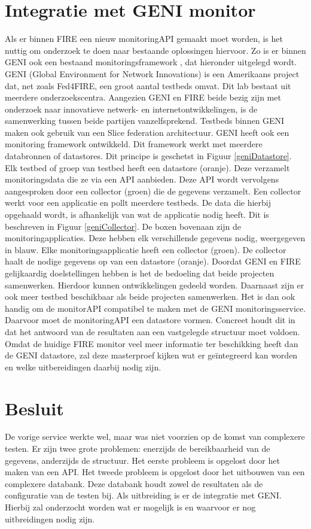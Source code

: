 \section{Integratie met GENI monitor}
\npar
Als er binnen FIRE een nieuw monitoringAPI gemaakt moet worden, is het nuttig om onderzoek te doen naar bestaande oplossingen hiervoor. Zo is er binnen GENI ook een bestaand monitoringsframework \citep{geni-monitor}, dat hieronder uitgelegd wordt.
\npar
GENI (Global Environment for Network Innovations) is een Amerikaans project dat, net zoals Fed4FIRE, een groot aantal testbeds omvat. Dit lab bestaat uit meerdere onderzoekscentra. Aangezien GENI en FIRE beide bezig zijn met onderzoek naar innovatieve netwerk- en internetontwikkelingen, is de samenwerking tussen beide partijen vanzelfsprekend.
\clearpage
\npar
Testbeds binnen GENI maken ook gebruik van een Slice federation architectuur. GENI heeft ook een monitoring framework ontwikkeld. Dit framework werkt met meerdere databronnen of datastores. Dit principe is geschetst in Figuur \ref{geniDatastore}. Elk testbed of groep van testbed heeft een datastore (oranje). Deze verzamelt monitoringsdata die ze via een API aanbieden. Deze API wordt vervolgens aangesproken door een collector (groen) die de gegevens verzamelt.
\npar
Een collector werkt voor een applicatie en pollt meerdere testbeds. De data die hierbij opgehaald wordt, is afhankelijk van wat de applicatie nodig heeft. Dit is beschreven in Figuur \ref{geniCollector}. De boxen bovenaan zijn de monitoringapplicaties. Deze hebben elk verschillende gegevens nodig, weergegeven in blauw. Elke monitoringsapplicatie heeft een collector (groen). De collector haalt de nodige gegevens op van een datastore (oranje).
\npar
Doordat GENI en FIRE gelijkaardig doelstellingen hebben is het de bedoeling dat beide projecten samenwerken. Hierdoor kunnen ontwikkelingen gedeeld worden. Daarnaast zijn er ook meer testbed beschikbaar als beide projecten samenwerken. Het is dan ook handig om de monitorAPI compatibel te maken met de GENI monitoringsservice. Daarvoor moet de monitoringAPI een datastore vormen. Concreet houdt dit in dat het antwoord van de resultaten aan een vastgelegde structuur moet voldoen. Omdat de huidige FIRE monitor veel meer informatie ter beschikking heeft dan de GENI datastore, zal deze masterproef kijken wat er ge\"integreerd kan worden en welke uitbereidingen daarbij nodig zijn.
\section{Besluit}
De vorige service werkte wel, maar was niet voorzien op de komst van complexere testen. Er zijn twee grote problemen: enerzijds de bereikbaarheid van de gegevens, anderzijds de structuur. Het eerste probleem is opgelost door het maken van een API. Het tweede probleem is opgelost door het uitbouwen van een complexere databank. Deze databank houdt zowel de resultaten als de configuratie van de testen bij. Als uitbreiding is er de integratie met GENI. Hierbij zal onderzocht worden wat er mogelijk is en waarvoor er nog uitbreidingen nodig zijn.